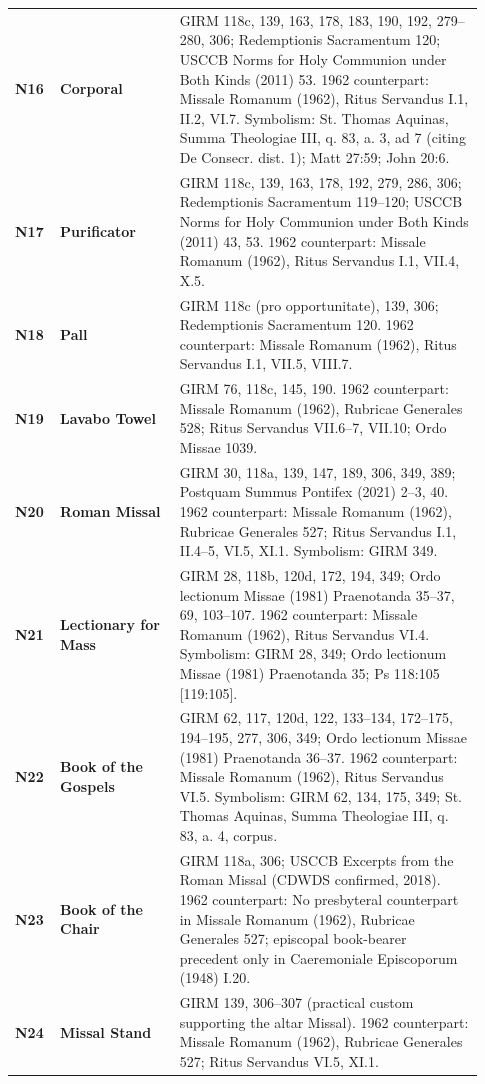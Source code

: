 {\begin{longtable}{>{\raggedright\arraybackslash}p{0.08\linewidth}>{\raggedright\arraybackslash}p{0.24\linewidth}>{\raggedright\arraybackslash}p{0.61\linewidth}}
\textbf{N16} & \textbf{Corporal} & GIRM 118c, 139, 163, 178, 183, 190, 192, 279--280, 306; Redemptionis Sacramentum 120; USCCB Norms for Holy Communion under Both Kinds (2011) 53. 1962 counterpart: Missale Romanum (1962), Ritus Servandus I.1, II.2, VI.7. Symbolism: St. Thomas Aquinas, Summa Theologiae III, q. 83, a. 3, ad 7 (citing De Consecr. dist. 1); Matt 27:59; John 20:6. \\
\textbf{N17} & \textbf{Purificator} & GIRM 118c, 139, 163, 178, 192, 279, 286, 306; Redemptionis Sacramentum 119--120; USCCB Norms for Holy Communion under Both Kinds (2011) 43, 53. 1962 counterpart: Missale Romanum (1962), Ritus Servandus I.1, VII.4, X.5. \\
\textbf{N18} & \textbf{Pall} & GIRM 118c (pro opportunitate), 139, 306; Redemptionis Sacramentum 120. 1962 counterpart: Missale Romanum (1962), Ritus Servandus I.1, VII.5, VIII.7. \\
\textbf{N19} & \textbf{Lavabo Towel} & GIRM 76, 118c, 145, 190. 1962 counterpart: Missale Romanum (1962), Rubricae Generales 528; Ritus Servandus VII.6--7, VII.10; Ordo Missae 1039. \\
\textbf{N20} & \textbf{Roman Missal} & GIRM 30, 118a, 139, 147, 189, 306, 349, 389; Postquam Summus Pontifex (2021) 2--3, 40. 1962 counterpart: Missale Romanum (1962), Rubricae Generales 527; Ritus Servandus I.1, II.4--5, VI.5, XI.1. Symbolism: GIRM 349. \\
\textbf{N21} & \textbf{Lectionary for Mass} & GIRM 28, 118b, 120d, 172, 194, 349; Ordo lectionum Missae (1981) Praenotanda 35--37, 69, 103--107. 1962 counterpart: Missale Romanum (1962), Ritus Servandus VI.4. Symbolism: GIRM 28, 349; Ordo lectionum Missae (1981) Praenotanda 35; Ps 118:105 [119:105]. \\
\textbf{N22} & \textbf{Book of the Gospels} & GIRM 62, 117, 120d, 122, 133--134, 172--175, 194--195, 277, 306, 349; Ordo lectionum Missae (1981) Praenotanda 36--37. 1962 counterpart: Missale Romanum (1962), Ritus Servandus VI.5. Symbolism: GIRM 62, 134, 175, 349; St. Thomas Aquinas, Summa Theologiae III, q. 83, a. 4, corpus. \\
\textbf{N23} & \textbf{Book of the Chair} & GIRM 118a, 306; USCCB Excerpts from the Roman Missal (CDWDS confirmed, 2018). 1962 counterpart: No presbyteral counterpart in Missale Romanum (1962), Rubricae Generales 527; episcopal book-bearer precedent only in Caeremoniale Episcoporum (1948) I.20. \\
\textbf{N24} & \textbf{Missal Stand} & GIRM 139, 306--307 (practical custom supporting the altar Missal). 1962 counterpart: Missale Romanum (1962), Rubricae Generales 527; Ritus Servandus VI.5, XI.1. \\

\end{longtable}}
